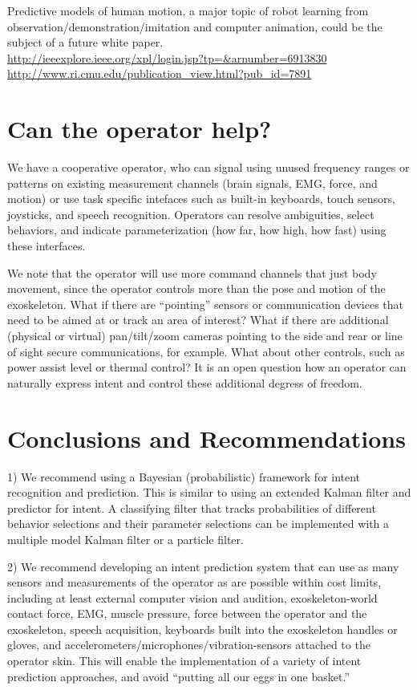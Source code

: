 \documentclass[letterpaper,12pt,fullpage]{article}
\begin{document}
Predictive models of human motion, a major topic of robot learning from\\
observation/demonstration/imitation and computer animation,
could be the subject of a future white
paper.\\
\url{http://ieeexplore.ieee.org/xpl/login.jsp?tp=&arnumber=6913830}\\
\url{http://www.ri.cmu.edu/publication_view.html?pub_id=7891}

\section{Can the operator help?}

We have a cooperative operator, who can signal using unused frequency
ranges or patterns on existing measurement
channels (brain signals, EMG, force, and motion) or use 
task specific intefaces such as built-in keyboards, touch sensors, joysticks,
and speech recognition.
Operators can resolve ambiguities, select behaviors, and indicate
parameterization (how far, how high, how fast) using these interfaces.

We note that the operator will use more command channels that just
body movement, since
the operator controls more than the pose and motion of the
exoskeleton. What if there are ``pointing'' sensors or communication
devices that need to be aimed at or track an area of interest? What if
there are additional (physical or virtual) pan/tilt/zoom cameras
pointing to the side and rear or line of sight secure communications,
for example. What about other controls, such as power assist level or
thermal control? It is an open question
how an operator can naturally express intent and
control these additional degress of freedom.

\section{Conclusions and Recommendations}

1) We recommend using a Bayesian (probabilistic) framework for intent recognition
and prediction. This is similar to using an extended
Kalman filter and predictor for intent.
A classifying filter that tracks probabilities of different behavior selections
and their parameter selections can be implemented with a multiple model Kalman
filter or a particle filter.

2) We recommend developing an intent prediction system that can use
as many sensors and measurements of the operator as are possible within cost limits,
including at least external computer vision and audition, exoskeleton-world contact
force,
EMG, muscle pressure, force between the operator and the
exoskeleton,
speech acquisition, keyboards built into the exoskeleton handles or gloves,
and accelerometers/microphones/vibration-sensors attached to the operator skin.
This will enable the implementation of a variety of intent prediction approaches,
and avoid ``putting all our eggs in one basket.''
\end{document}
